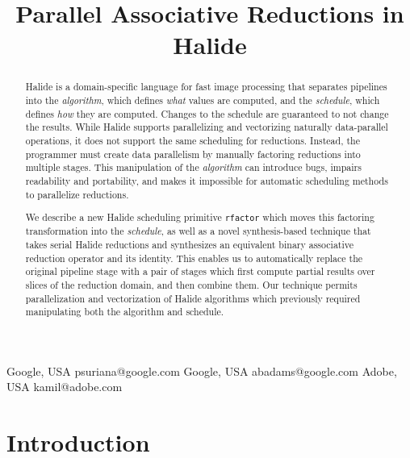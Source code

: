 \documentclass[10pt,numbers]{sigplanconf}
\newcommand{\code}[1]{\texttt{#1}}
\begin{document}
\makeatletter
\def\@copyrightspace{\relax}
\makeatother


\title{Parallel Associative Reductions in Halide}

           {Google, USA}
           {psuriana@google.com}
           {Google, USA}
           {abadams@google.com}
           {Adobe, USA}
           {kamil@adobe.com}

\maketitle
\begin{abstract}

  Halide is a domain-specific language for fast image processing that separates pipelines into the \emph{algorithm}, which defines \emph{what} values are computed, and the \emph{schedule}, which defines \emph{how} they are computed. Changes to the schedule are guaranteed to not change the results. While Halide supports parallelizing and vectorizing naturally data-parallel operations, it does not support the same scheduling for reductions. Instead, the programmer must create data parallelism by manually factoring reductions into multiple stages. This manipulation of the \emph{algorithm} can introduce bugs, impairs readability and portability, and makes it impossible for automatic scheduling methods to parallelize reductions.

  We describe a new Halide scheduling primitive \code{rfactor} which moves this factoring transformation into the \emph{schedule}, as well as a novel synthesis-based technique that takes serial Halide reductions and synthesizes an equivalent binary associative reduction operator and its identity. This enables us to automatically replace the original pipeline stage with a pair of stages which first compute partial results over slices of the reduction domain, and then combine them. Our technique permits parallelization and vectorization of Halide algorithms which previously required manipulating both the algorithm and schedule.

\end{abstract}


%
%


\section{Introduction}
\label{introduction}

\end{document}
